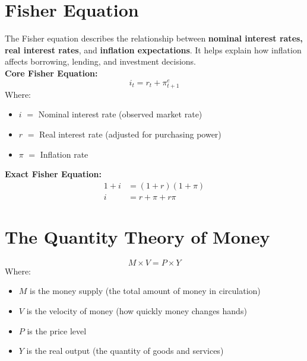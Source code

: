 \documentclass[a4paper, 11pt]{article}
\begin{document}
\section{Fisher Equation}
The Fisher equation describes the relationship between \textbf{nominal interest rates, real interest rates}, and \textbf{inflation expectations}. It helps explain how inflation affects borrowing, lending, and investment decisions.\\[6pt]
\textbf{Core Fisher Equation:}
\[ i_t = r_t + \pi_{t+1}^e \]
Where:
\begin{itemize}
    \item $i$ $=$ Nominal interest rate (observed market rate)
    \item $r$ $=$ Real interest rate (adjusted for purchasing power)
    \item $\pi$ $=$ Inflation rate
\end{itemize}
\textbf{Exact Fisher Equation:}
\begin{align*}
    1+i&=(1+r)(1+\pi)\\[6pt]
    i&=r+\pi+r\pi
\end{align*}

\section{The Quantity Theory of Money}
\[ M \times V = P \times Y \]
Where:
\begin{itemize}
    \item $M$ is the money supply (the total amount of money in circulation)
    \item $V$ is the velocity of money (how quickly money changes hands)
    \item $P$ is the price level
    \item $Y$ is the real output (the quantity of goods and services)
\end{itemize}
\end{document}
